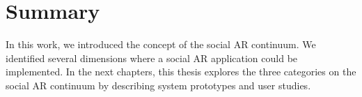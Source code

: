 





\section{Summary}

In this work, we introduced the concept of the social AR continuum. We identified several dimensions where a social AR application could be implemented.
In the next chapters, this thesis explores the three categories on the social AR continuum by describing system prototypes and user studies. 

